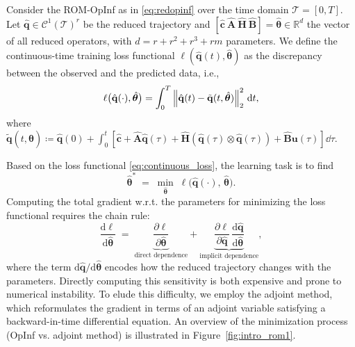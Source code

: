\begin{definition} 
    \label{def:continuous_loss}
    Consider the ROM-OpInf as in \eqref{eq:redopinf} over the time domain $\mathcal{T}=[0,T]$. Let $\hat{\mathbf{q}}\in\mathcal{C}^1(\mathcal{T})^r$ be the reduced trajectory and $[\hat{\mathbf{c}}~\hat{\mathbf{A}}~\hat{\mathbf{H}}~\hat{\mathbf{B}}]=\hat{\bm{\theta}}\in\mathbb{R}^d$ the vector of all reduced operators, with $d=r+r^2+r^3+rm$ parameters. We define the continuous-time training loss functional $\ell(\hat{\mathbf{q}}(t),\hat{\bm{\theta}})$ as the discrepancy between the observed and the predicted data, i.e.,\\
    \begin{equation}
        \ell\bigl(\hat{\mathbf{q}}(\cdot),\hat{\bm{\theta}}\bigr) = \int_0^T \norm{\hat{\mathbf{q}}(t) - \tilde{\mathbf{q}}(t, \hat{\bm{\theta}})}_2^2~\dd t,
        \label{eq:continuous_loss}
    \end{equation}
    where $\tilde{\mathbf{q}}(t, \hat{\bm{\theta}}) \coloneqq \hat{\mathbf{q}}(0) + \displaystyle\int_{0}^t\left[ \hat{\mathbf{c}} + \hat{\mathbf{A}}\hat{\mathbf{q}}(\tau) + \hat{\mathbf{H}}\left(\hat{\mathbf{q}}(\tau)\otimes\hat{\mathbf{q}}(\tau) \right) +\hat{\mathbf{B}}\mathbf{u}(\tau) \right]\dd \tau $.

\end{definition}

Based on the loss functional \eqref{eq:continuous_loss}, the learning task is to find\\
\begin{equation}
  \hat{\bm{\theta}}^*
  \;=\;
  \min_{\hat{\bm{\theta}}}\;
  \ell\bigl(\hat{\mathbf{q}}(\cdot),\,\hat{\bm{\theta}}\bigr).
\end{equation}
Computing the total gradient w.r.t. the parameters for minimizing the loss functional requires the chain rule:\\
\begin{equation}
  \frac{\mathrm{d}\ell}{\mathrm{d}\hat{\bm{\theta}}}
  \;=\;
  \underbrace{\frac{\partial \ell}{\partial \hat{\bm{\theta}}}}_{\text{direct dependence}}
  +
  \underbrace{\frac{\partial \ell}{\partial \hat{\mathbf{q}}}\,
                \frac{\mathrm{d} \hat{\mathbf{q}}}{\mathrm{d} \hat{\bm{\theta}}}
               }_{\text{implicit dependence}},
    \label{eq:l_gradient}
\end{equation}
where the term $\mathrm{d} \hat{\mathbf{q}}/\mathrm{d} \hat{\bm{\theta}}$ encodes how the reduced trajectory changes with the parameters.  Directly computing this sensitivity is both expensive and prone to numerical instability.  To elude this difficulty, we employ the adjoint method, which reformulates the gradient in terms of an adjoint variable satisfying a backward-in-time differential equation. An overview of the minimization process (OpInf vs. adjoint method) is illustrated in Figure~\ref{fig:intro_rom1}.


